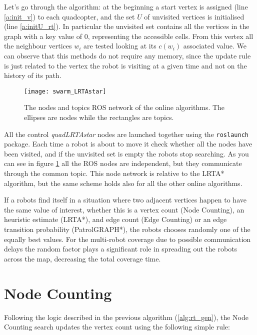 Let's go through the algorithm: at the beginning a start vertex is assigned (line \ref{a:init_v}) to each quadcopter, and the set $U$ of unvisited vertices is initialised (line \ref{a:initU_rt}). In particular the unvisited set contains all the vertices in the graph with a key value of 0, representing the accessible cells. From this vertex all the neighbour vertices $w_i$ are tested looking at its $c(w_i)$ associated value. We can observe that this methods do not require any memory, since the update rule is just related to the vertex the robot is visiting at a given time and not on the history of its path.

\begin{figure}[t]
\centering
\texttt{[image: swarm\_LRTAstar]}
\caption[ROS network for the online algorithms]{The nodes and topics ROS network of the online algorithms. The ellipses are nodes while the rectangles are topics.}
\label{fig:rt_nodes}
\end{figure}

All the control \emph{quadLRTAstar} nodes are launched together using the \texttt{roslaunch} package. Each time a robot is about to move it check whether all the nodes have been visited, and if the unvisited set is empty the robots stop searching.
As you can see in figure \ref{fig:rt_nodes} all the ROS nodes are independent, but they communicate through the common topic. This node network is relative to the LRTA* algorithm, but the same scheme holds also for all the other online algorithms.

If a robots find itself in a situation where two adjacent vertices happen to have the same value of interest, whether this is a vertex count (Node Counting), an heuristic estimate (LRTA*), and edge count (Edge Counting) or an edge transition probability (PatrolGRAPH*), the robots chooses randomly one of the equally best values. For the multi-robot coverage due to possible communication delays the random factor plays a significant role in spreading out the robots across the map, decreasing the total coverage time.




\section{Node Counting}

Following the logic described in the previous algorithm (\ref{alg:rt_gen}), the Node Counting search updates the vertex count using the following simple rule:

